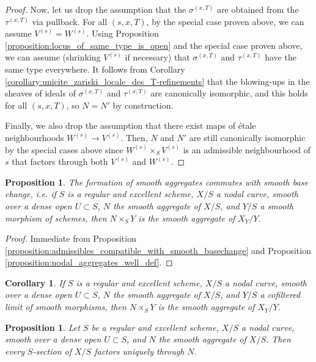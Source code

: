 \documentclass[a4paper,12pt]{amsart} %
\numberwithin{equation}{subsection}
\theoremstyle{definition}
\theoremstyle{plain}%
\newtheorem{proposition}[definition]{Proposition}
\newtheorem{corollary}[definition]{Corollary}
\theoremstyle{remark}
\begin{document}
\begin{proof}
Now, let us drop the assumption that the $\sigma^{(x,T)}$ are obtained from the $\tau^{(x,T)}$ via pullback. For all $(s,x,T)$, by the special case proven above, we can assume $V^{(s)}=W^{(s)}$. Using Proposition \ref{proposition:locus_of_same_type_is_open} and the special case proven above, we can assume (shrinking $V^{(s)}$ if necessary) that $\sigma^{(x,T)}$ and $\tau^{(x,T)}$ have the same type everywhere. It follows from Corollary \ref{corollary:unicite_zariski_locale_des_T-refinements} that the blowing-ups in the sheaves of ideals of $\sigma^{(x,T)}$ and $\tau^{(x,T)}$ are canonically isomorphic, and this holds for all $(s,x,T)$, so $N=N'$ by construction.

Finally, we also drop the assumption that there exist maps of \'etale neighbourhoods $W^{(s)}\to V^{(s)}$. Then, $N$ and $N'$ are still canonically isomorphic by the special cases above since $W^{(s)}\times_S V^{(s)}$ is an admissible neighbourhood of $s$ that factors through both $V^{(s)}$ and $W^{(s)}$.
\end{proof}

\begin{proposition}\label{proposition:nodal_aggregates_commute_w_smooth_maps}
The formation of smooth aggregates commutes with smooth base change, i.e. if $S$ is a regular and excellent scheme, $X/S$ a nodal curve, smooth over a dense open $U\subset S$, $N$ the smooth aggregate of $X/S$, and $Y/S$ a smooth morphism of schemes, then $N\times_S Y$ is the smooth aggregate of $X_Y/Y$.
\end{proposition}

\begin{proof}
Immediate from Proposition \ref{proposition:admissibles_compatible_with_smooth_basechange} and Proposition \ref{proposition:nodal_aggregates_well_def}.
\end{proof}

\begin{corollary}\label{corollary:nodal_aggregates_commute_w_limits_of_smooth_maps}
If $S$ is a regular and excellent scheme, $X/S$ a nodal curve, smooth over a dense open $U\subset S$, $N$ the smooth aggregate of $X/S$, and $Y/S$ a cofiltered limit of smooth morphisms, then $N\times_S Y$ is the smooth aggregate of $X_Y/Y$.
\end{corollary}


\begin{proposition}\label{proposition:sections_factor_through_nodal_aggregates}
Let $S$ be a regular and excellent scheme, $X/S$ a nodal curve, smooth over a dense open $U\subset S$, and $N$ the smooth aggregate of $X/S$. Then every $S$-section of $X/S$ factors uniquely through $N$.
\end{proposition}
\end{document}
